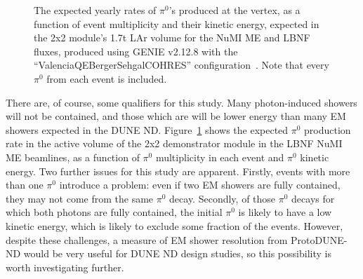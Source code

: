 \begin{figure}[htb]
  \centering
  \caption{The expected yearly rates of $\pi^{0}$'s produced at the vertex, as a function of event multiplicity and their kinetic energy, expected in the 2x2 module's 1.7t LAr volume for the NuMI ME and LBNF fluxes, produced using GENIE v2.12.8 with the ``ValenciaQEBergerSehgalCOHRES'' configuration~\cite{genie}. Note that every $\pi^{0}$ from each event is included.}
  \label{fig:pi0_kinematics}
\end{figure}
There are, of course, some qualifiers for this study. Many photon-induced showers will not be contained, and those which are will be lower energy than many EM showers expected in the DUNE ND. Figure~\ref{fig:pi0_kinematics} shows the expected $\pi^{0}$ production rate in the active volume of the 2x2 demonstrator module in the LBNF NuMI ME beamlines, as a function of $\pi^{0}$ multiplicity in each event and $\pi^{0}$ kinetic energy. Two further issues for this study are apparent. Firstly, events with more than one $\pi^{0}$ introduce a problem: even if two EM showers are fully contained, they may not come from the same $\pi^{0}$ decay. Secondly, of those $\pi^{0}$ decays for which both photons are fully contained, the initial $\pi^{0}$ is likely to have a low kinetic energy, which is likely to exclude some fraction of the events. However, despite these challenges, a measure of EM shower resolution from ProtoDUNE-ND would be very useful for DUNE ND design studies, so this possibility is worth investigating further.

